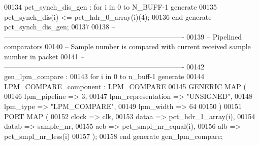 \begin{DoxyCode}
00134    \textcolor{vhdlchar}{pct\_synch\_dis\_gen} \textcolor{vhdlchar}{:} \textcolor{keywordflow}{for} \textcolor{vhdlchar}{i} \textcolor{keywordflow}{in} \textcolor{vhdllogic}{}\textcolor{vhdllogic}{0} \textcolor{keywordflow}{to} \textcolor{vhdlchar}{N_BUFF}\textcolor{vhdlchar}{-}\textcolor{vhdllogic}{}\textcolor{vhdllogic}{1} \textcolor{keywordflow}{generate} 
00135       \textcolor{vhdlchar}{pct_synch_dis}\textcolor{vhdlchar}{(}\textcolor{vhdlchar}{i}\textcolor{vhdlchar}{)} \textcolor{vhdlchar}{<=} \textcolor{vhdlchar}{pct_hdr_0_array}\textcolor{vhdlchar}{(}\textcolor{vhdlchar}{i}\textcolor{vhdlchar}{)}\textcolor{vhdlchar}{(}\textcolor{vhdllogic}{}\textcolor{vhdllogic}{4}\textcolor{vhdlchar}{)};
00136    \textcolor{keywordflow}{end} \textcolor{keywordflow}{generate} \textcolor{vhdlchar}{pct\_synch\_dis\_gen}; 
00137    
00138 \textcolor{keyword}{-- ----------------------------------------------------------------------------}
00139 \textcolor{keyword}{-- Pipelined comparators}
00140 \textcolor{keyword}{-- Sample number is compared with current received sample number in packet}
00141 \textcolor{keyword}{-- ----------------------------------------------------------------------------}
00142    \textcolor{vhdlchar}{gen\_lpm\_compare} \textcolor{vhdlchar}{:} 
00143    \textcolor{keywordflow}{for} \textcolor{vhdlchar}{i} \textcolor{keywordflow}{in} \textcolor{vhdllogic}{}\textcolor{vhdllogic}{0} \textcolor{keywordflow}{to} \textcolor{vhdlchar}{n\_buff}\textcolor{vhdlchar}{-}\textcolor{vhdllogic}{}\textcolor{vhdllogic}{1} \textcolor{keywordflow}{generate}
00144    LPM\_COMPARE\_component : LPM\_COMPARE
00145       \textcolor{keywordflow}{GENERIC} \textcolor{keywordflow}{MAP} (
00146          lpm\_pipeline         => \textcolor{vhdllogic}{3},
00147          lpm\_representation   => \textcolor{keyword}{"UNSIGNED"},
00148          lpm\_type             => \textcolor{keyword}{"LPM\_COMPARE"},
00149          lpm\_width            => \textcolor{vhdllogic}{64}
00150       \textcolor{vhdlchar}{)}
00151       \textcolor{keywordflow}{PORT} \textcolor{keywordflow}{MAP} (
00152          clock                => clk,
00153          dataa                => pct_hdr_1_array\textcolor{vhdlchar}{(}i\textcolor{vhdlchar}{)},
00154          datab                => sample_nr,
00155          aeb                  => pct_smpl_nr_equal\textcolor{vhdlchar}{(}i\textcolor{vhdlchar}{)},
00156          alb                  => pct_smpl_nr_less\textcolor{vhdlchar}{(}i\textcolor{vhdlchar}{)}
00157       \textcolor{vhdlchar}{)};
00158    \textcolor{keywordflow}{end} \textcolor{keywordflow}{generate} \textcolor{vhdlchar}{gen\_lpm\_compare};  

\end{DoxyCode}
